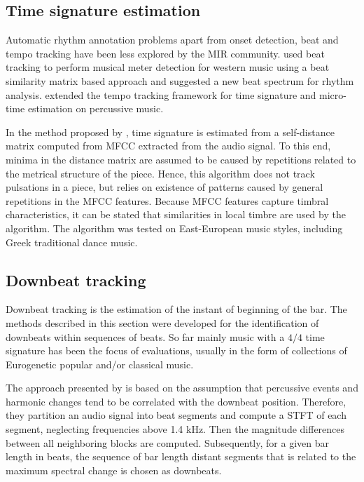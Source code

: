 \subsection{Time signature estimation}
Automatic rhythm annotation problems apart from onset detection, beat and tempo tracking have been less explored by the MIR community.  used beat tracking to perform musical meter detection for western music using a beat similarity matrix based approach and  suggested a new beat spectrum for rhythm analysis.  extended the tempo tracking framework for time signature and micro-time estimation on percussive music. 

In the method proposed by , time signature is estimated from a self-distance matrix computed from \gls{MFCC} extracted from the audio signal. To this end, minima in the distance matrix are assumed to be caused by repetitions related to the metrical structure of the piece. Hence, this algorithm does not track pulsations in a piece, but relies on existence of patterns caused by general repetitions in the \gls{MFCC} features. Because \gls{MFCC} features capture timbral characteristics, it can be stated that similarities in local timbre are used by the algorithm. The algorithm was tested on East-European music styles, including Greek traditional dance music.
%
\subsection{Downbeat tracking}
Downbeat tracking is the estimation of the instant of beginning of the bar. The methods described in this section were developed for the identification of downbeats within sequences of beats. So far mainly music with a $4/4$ time signature has been the focus of evaluations, usually in the form of collections of Eurogenetic popular and/or classical music. 

The approach presented by  is based on the assumption that percussive events and harmonic changes tend to be correlated with the downbeat position. Therefore, they partition an audio signal into beat segments and compute a \gls{STFT} of each segment, neglecting frequencies above 1.4 kHz. Then the magnitude differences between all neighboring blocks are computed. Subsequently, for a given bar length in beats, the sequence of bar length distant segments that is related to the maximum spectral change is chosen as downbeats. 

